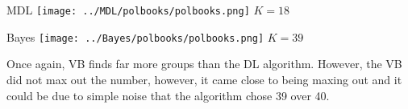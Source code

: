 \begin{minipage}{0.45\linewidth}
MDL
\centering
\texttt{[image: ../MDL/polbooks/polbooks.png]}
$K=18$

\end{minipage}
\begin{minipage}{0.45\linewidth}
Bayes
\centering
\texttt{[image: ../Bayes/polbooks/polbooks.png]}
$K=39$
\end{minipage}
\vspace{10pt}

Once again, VB finds far more groups than the DL algorithm. However, the VB
did not max out the number, however, it came close to being maxing out and
it could be due to simple noise that the algorithm chose 39 over 40.
